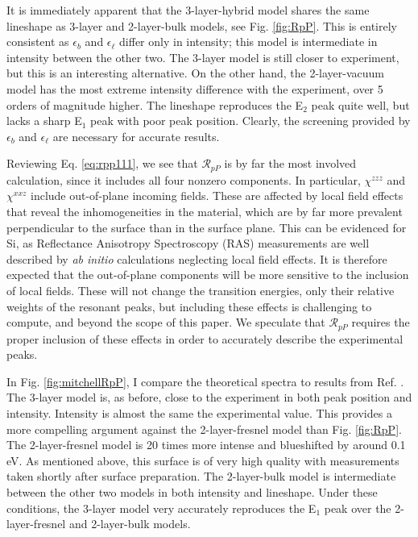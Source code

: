 It is immediately apparent that the 3-layer-hybrid model shares the same
lineshape as 3-layer and 2-layer-bulk models, see Fig. \ref{fig:RpP}. This is
entirely consistent as $\epsilon_{b}$ and $\epsilon_{\ell}$ differ only in
intensity; this model is intermediate in intensity between the other two. The
3-layer model is still closer to experiment, but this is an interesting
alternative. On the other hand, the 2-layer-vacuum model has the most extreme
intensity difference with the experiment, over 5 orders of magnitude higher. The
lineshape reproduces the E$_{2}$ peak quite well, but lacks a sharp E$_{1}$ peak
with poor peak position. Clearly, the screening provided by $\epsilon_{b}$ and
$\epsilon_{\ell}$ are necessary for accurate results.

Reviewing Eq. \eqref{eq:rpp111}, we see that $\mathcal{R}_{pP}$ is by far the
most involved calculation, since it includes all four nonzero components. In
particular, $\chi^{zzz}$ and $\chi^{xxz}$ include out-of-plane incoming fields.
These are affected by local field effects\cite{tancognedejean:tel-01235611} that
reveal the inhomogeneities in the material, which are by far more prevalent
perpendicular to the surface than in the surface plane. This can be evidenced
for Si, as Reflectance Anisotropy Spectroscopy (RAS) measurements are well
described by \emph{ab initio} calculations neglecting local field
effects.\cite{palummoPRB99, gaalPRB09} It is therefore expected that the
out-of-plane components will be more sensitive to the inclusion of local fields.
These will not change the transition energies, only their relative weights of
the resonant peaks,\cite{tancognedejean:tel-01235611} but including these
effects is challenging to compute,\cite{nicolasPRB15} and beyond the scope of
this paper. We speculate that $\mathcal{R}_{pP}$ requires the proper inclusion
of these effects in order to accurately describe the experimental peaks.

In Fig. \ref{fig:mitchellRpP}, I compare the theoretical spectra to results from
Ref. \cite{mitchellSS01}. The 3-layer model is, as before, close to the
experiment in both peak position and intensity. Intensity is almost the same the
experimental value. This provides a more compelling argument against the
2-layer-fresnel model than Fig. \ref{fig:RpP}. The 2-layer-fresnel model is 20
times more intense and blueshifted by around 0.1 eV. As mentioned above, this
surface is of very high quality with measurements taken shortly after surface
preparation. The 2-layer-bulk model is intermediate between the other two models
in both intensity and lineshape. Under these conditions, the 3-layer model very
accurately reproduces the E$_{1}$ peak over the 2-layer-fresnel and 2-layer-bulk
models.

